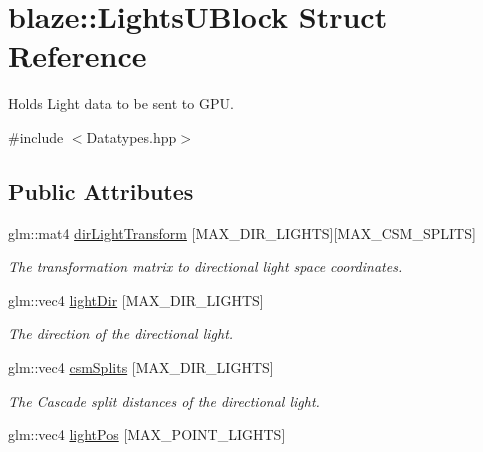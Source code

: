 \hypertarget{structblaze_1_1LightsUBlock}{}\section{blaze\+:\+:Lights\+U\+Block Struct Reference}
\label{structblaze_1_1LightsUBlock}


Holds Light data to be sent to G\+PU.  




{\ttfamily \#include $<$Datatypes.\+hpp$>$}

\subsection*{Public Attributes}
\begin{DoxyCompactItemize}
\item 
\mbox{\label{structblaze_1_1LightsUBlock_a34b050e592a1ae2adfe97a6ab299fc44}} 
glm\+::mat4 \hyperlink{structblaze_1_1LightsUBlock_a34b050e592a1ae2adfe97a6ab299fc44}{dir\+Light\+Transform} \mbox{[}M\+A\+X\+\_\+\+D\+I\+R\+\_\+\+L\+I\+G\+H\+TS\mbox{]}\mbox{[}M\+A\+X\+\_\+\+C\+S\+M\+\_\+\+S\+P\+L\+I\+TS\mbox{]}
\begin{DoxyCompactList}\small\item\em The transformation matrix to directional light space coordinates. \end{DoxyCompactList}\item 
glm\+::vec4 \hyperlink{structblaze_1_1LightsUBlock_a37c75420ca15714012d45d66e6519514}{light\+Dir} \mbox{[}M\+A\+X\+\_\+\+D\+I\+R\+\_\+\+L\+I\+G\+H\+TS\mbox{]}
\begin{DoxyCompactList}\small\item\em The direction of the directional light. \end{DoxyCompactList}\item 
glm\+::vec4 \hyperlink{structblaze_1_1LightsUBlock_a5cf761c28dd781d9b239af72acdb5589}{csm\+Splits} \mbox{[}M\+A\+X\+\_\+\+D\+I\+R\+\_\+\+L\+I\+G\+H\+TS\mbox{]}
\begin{DoxyCompactList}\small\item\em The Cascade split distances of the directional light. \end{DoxyCompactList}\item 
glm\+::vec4 \hyperlink{structblaze_1_1LightsUBlock_af38bd2379a184e9153cf7261a96012fd}{light\+Pos} \mbox{[}M\+A\+X\+\_\+\+P\+O\+I\+N\+T\+\_\+\+L\+I\+G\+H\+TS\mbox{]}

\end{DoxyCompactItemize}

